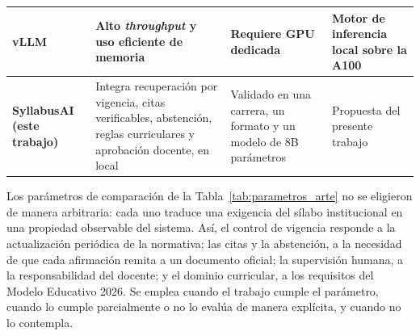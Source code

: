 \begin{table}[htbp]
\begin{tabular}{|>{\raggedright\arraybackslash}p{2.3cm}|>{\raggedright\arraybackslash}p{3.3cm}|>{\raggedright\arraybackslash}p{3.3cm}|>{\raggedright\arraybackslash}p{3.6cm}|}
    \hline
    vLLM~\cite{kwon2023vllm} & Alto \textit{throughput} y uso eficiente de memoria & Requiere GPU dedicada & Motor de inferencia local sobre la A100 \\
    \hline
    \textbf{SyllabusAI (este trabajo)} & Integra recuperación por vigencia, citas verificables, abstención, reglas curriculares y aprobación docente, en local & Validado en una carrera, un formato y un modelo de 8B parámetros & Propuesta del presente trabajo \\
    \hline
  \end{tabular}
  \par\vspace{6pt}\normalsize\justifying
\end{table}

Los parámetros de comparación de la Tabla~\ref{tab:parametros_arte} no se eligieron de manera arbitraria: cada uno traduce una exigencia del sílabo institucional en una propiedad observable del sistema. Así, el control de vigencia responde a la actualización periódica de la normativa; las citas y la abstención, a la necesidad de que cada afirmación remita a un documento oficial; la supervisión humana, a la responsabilidad del docente; y el dominio curricular, a los requisitos del Modelo Educativo 2026. Se emplea \cmark{} cuando el trabajo cumple el parámetro, \pmark{} cuando lo cumple parcialmente o no lo evalúa de manera explícita, y \xmark{} cuando no lo contempla.


